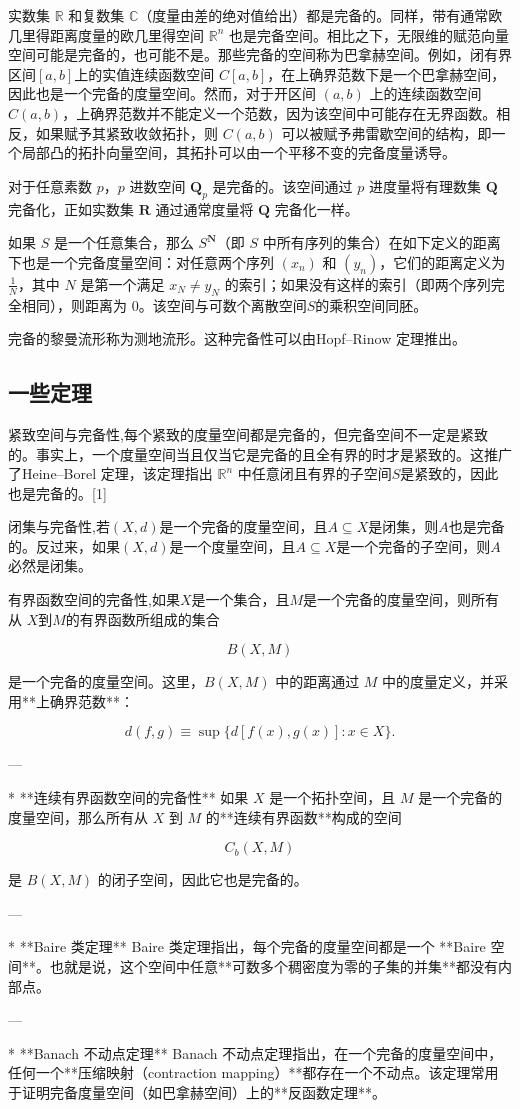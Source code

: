 实数集 $\mathbb{R}$ 和复数集 $\mathbb{C}$（度量由差的绝对值给出）都是完备的。同样，带有通常欧几里得距离度量的欧几里得空间 $\mathbb{R}^n$ 也是完备空间。相比之下，无限维的赋范向量空间可能是完备的，也可能不是。那些完备的空间称为巴拿赫空间。例如，闭有界区间$[a, b]$上的实值连续函数空间 $C[a,b]$，在上确界范数下是一个巴拿赫空间，因此也是一个完备的度量空间。然而，对于开区间 $(a, b)$ 上的连续函数空间 $C(a,b)$，上确界范数并不能定义一个范数，因为该空间中可能存在无界函数。相反，如果赋予其紧致收敛拓扑，则 $C(a,b)$ 可以被赋予弗雷歇空间的结构，即一个局部凸的拓扑向量空间，其拓扑可以由一个平移不变的完备度量诱导。


对于任意素数 $p$，$p$ 进数空间 $\mathbf{Q}_p$ 是完备的。该空间通过 $p$ 进度量将有理数集 $\mathbf{Q}$ 完备化，正如实数集 $\mathbf{R}$ 通过通常度量将 $\mathbf{Q}$ 完备化一样。

如果 $S$ 是一个任意集合，那么 $S^{\mathbf{N}}$（即 $S$ 中所有序列的集合）在如下定义的距离下也是一个完备度量空间：对任意两个序列 $\left(x_n\right)$ 和 $\left(y_n\right)$，它们的距离定义为$\frac{1}{N}$，其中 $N$ 是第一个满足 $x_N \neq y_N$ 的索引；如果没有这样的索引（即两个序列完全相同），则距离为 $0$。该空间与可数个离散空间$S$的乘积空间同胚。

完备的黎曼流形称为测地流形。这种完备性可以由Hopf–Rinow 定理推出。
\subsection{一些定理}
紧致空间与完备性,每个紧致的度量空间都是完备的，但完备空间不一定是紧致的。事实上，一个度量空间当且仅当它是完备的且全有界的时才是紧致的。这推广了Heine–Borel 定理，该定理指出 $\mathbb{R}^n$ 中任意闭且有界的子空间$S$是紧致的，因此也是完备的。[1]

闭集与完备性,若$(X,d)$是一个完备的度量空间，且$A \subseteq X$是闭集，则$A$也是完备的。反过来，如果$(X,d)$是一个度量空间，且$A \subseteq X$是一个完备的子空间，则$A$必然是闭集。

有界函数空间的完备性,如果$X$是一个集合，且$M$是一个完备的度量空间，则所有从 $X$到$M$的有界函数所组成的集合

  $$
  B(X,M)
  $$

  是一个完备的度量空间。这里，$B(X,M)$ 中的距离通过 $M$ 中的度量定义，并采用**上确界范数**：

  $$
  d(f,g) \equiv \sup \{ d[f(x),g(x)] : x \in X \}.
  $$

---

* **连续有界函数空间的完备性**
  如果 $X$ 是一个拓扑空间，且 $M$ 是一个完备的度量空间，那么所有从 $X$ 到 $M$ 的**连续有界函数**构成的空间

  $$
  C_b(X,M)
  $$

  是 $B(X,M)$ 的闭子空间，因此它也是完备的。

---

* **Baire 类定理**
  Baire 类定理指出，每个完备的度量空间都是一个 **Baire 空间**。也就是说，这个空间中任意**可数多个稠密度为零的子集的并集**都没有内部点。

---

* **Banach 不动点定理**
  Banach 不动点定理指出，在一个完备的度量空间中，任何一个**压缩映射（contraction mapping）**都存在一个不动点。该定理常用于证明完备度量空间（如巴拿赫空间）上的**反函数定理**。
